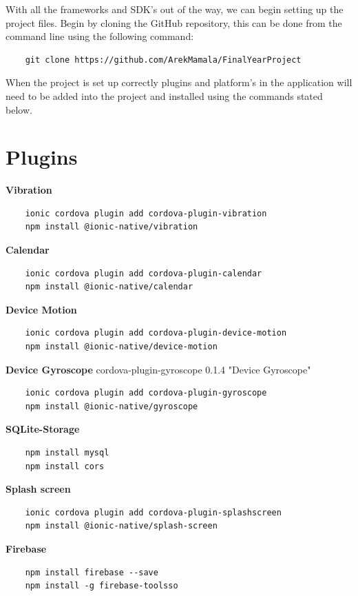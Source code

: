 \documentclass[a4paper,12pt]{report}
\begin{document}
With all the frameworks and SDK's out of the way, we can begin setting up
the project files. 
Begin by cloning the GitHub repository, this can be done from the command line using the following command:
\begin{lstlisting}
    git clone https://github.com/ArekMamala/FinalYearProject
\end{lstlisting}{}

When the project is set up correctly plugins and platform's in the application will need to be added into the project and installed using the commands stated below.
\section{Plugins}
\textbf{Vibration}
\begin{verbatim}
    ionic cordova plugin add cordova-plugin-vibration
    npm install @ionic-native/vibration
\end{verbatim}

\textbf{Calendar}
\begin{verbatim}
    ionic cordova plugin add cordova-plugin-calendar
    npm install @ionic-native/calendar
\end{verbatim}


\textbf{Device Motion}
\begin{verbatim}
    ionic cordova plugin add cordova-plugin-device-motion
    npm install @ionic-native/device-motion
\end{verbatim}{}


\textbf{Device Gyroscope} cordova-plugin-gyroscope 0.1.4 "Device Gyroscope"
\begin{verbatim}
    ionic cordova plugin add cordova-plugin-gyroscope
    npm install @ionic-native/gyroscope
\end{verbatim}


\textbf{SQLite-Storage}
\begin{verbatim}
    npm install mysql
    npm install cors
\end{verbatim}


\textbf{Splash screen}
\begin{verbatim}
    ionic cordova plugin add cordova-plugin-splashscreen
    npm install @ionic-native/splash-screen
\end{verbatim}{}


\textbf{Firebase}   
\begin{verbatim}
    npm install firebase --save
    npm install -g firebase-toolsso
\end{verbatim}
\end{document}
